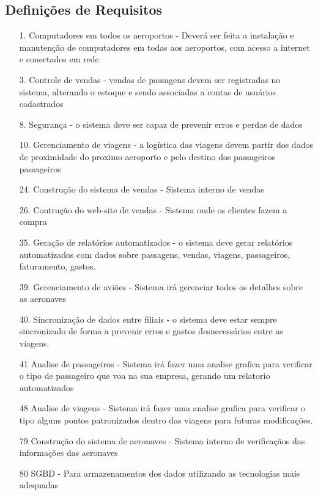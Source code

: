\subsection{Definições de Requisitos}
\begin{enumerate}

  \item[1.] Computadores em todos os aeroportos - Deverá ser feita a instalação e manutenção de
        computadores em todas aos aeroportos, com acesso a internet e conectados em rede\\      
  \item[3.] Controle de vendas - vendas de passagens devem ser registradas no sistema, alterando
        o estoque e sendo associadas a contas de usuários cadastrados\\
  \item[8.] Segurança - o sistema deve ser  capaz de prevenir erros e perdas de dados\\
  \item[10.] Gerenciamento de viagens - a logística das viagens devem partir dos dados de
        proximidade do proximo aeroporto e pelo destino dos passageiros passageiros\\
  \item[24.] Construção do sistema de vendas - Sistema interno de vendas \\
  \item[26.] Contrução do web-site de vendas - Sistema onde os clientes fazem a compra \\
  \item[35.] Geração de relatórios automatizados - o sistema deve gerar relatórios automatizados
        com dados sobre passagens, vendas, viagens, passageiros, faturamento, gastos.\\
  \item[39.] Gerenciamento de aviões - Sistema irá gerenciar todos os detalhes sobre as aeronaves\\
  \item[40.] Sincronização de dados entre filiais - o sistema deve estar sempre sincronizado de
        forma a prevenir erros e gastos desnecessários entre as viagens.
  \item[41] Analise de passageiros - Sistema irá fazer uma analise grafica para verificar o tipo
        de passageiro que voa na sua empresa, gerando um relatorio automatizados\\
  \item[48] Analise de viagens - Sistema irá fazer uma analise grafica para verificar o tipo
        alguns pontos patronizados dentro das viagens para futuras modificações.\\
  \item[79] Construção do sistema de aeronaves - Sistema interno de verificaçãos
        das informações das aeronaves \\
  \item[80] SGBD - Para armazenamentos dos dados utilizando as tecnologias mais adequadas
\end{enumerate}


